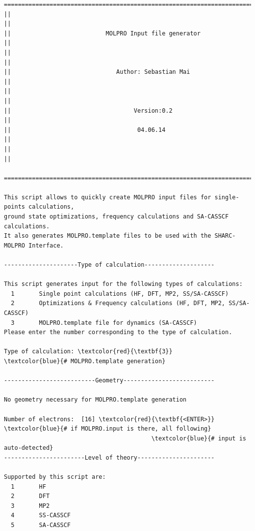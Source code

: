 \documentclass[a4paper,11pt,DIV=15,openany]{scrbook}
\begin{document}
\begin{oframed}
\footnotesize\begin{Verbatim}[commandchars=\\\{\}]
  ================================================================================
||                                                                                ||
||                           MOLPRO Input file generator                          ||
||                                                                                ||
||                              Author: Sebastian Mai                             ||
||                                                                                ||
||                                   Version:0.2                                  ||
||                                    04.06.14                                    ||
||                                                                                ||
  ================================================================================

This script allows to quickly create MOLPRO input files for single-points calculations,
ground state optimizations, frequency calculations and SA-CASSCF calculations. 
It also generates MOLPRO.template files to be used with the SHARC-MOLPRO Interface.
  
---------------------Type of calculation--------------------

This script generates input for the following types of calculations:
  1       Single point calculations (HF, DFT, MP2, SS/SA-CASSCF)
  2       Optimizations & Frequency calculations (HF, DFT, MP2, SS/SA-CASSCF)
  3       MOLPRO.template file for dynamics (SA-CASSCF)
Please enter the number corresponding to the type of calculation.

Type of calculation: \textcolor{red}{\textbf{3}}        \textcolor{blue}{# MOLPRO.template generation}

--------------------------Geometry--------------------------

No geometry necessary for MOLPRO.template generation

Number of electrons:  [16] \textcolor{red}{\textbf{<ENTER>}}        \textcolor{blue}{# if MOLPRO.input is there, all following}
                                          \textcolor{blue}{# input is auto-detected}
-----------------------Level of theory----------------------

Supported by this script are:
  1       HF
  2       DFT 
  3       MP2 
  4       SS-CASSCF
  5       SA-CASSCF 


\end{Verbatim}
\end{oframed}
\end{document}
